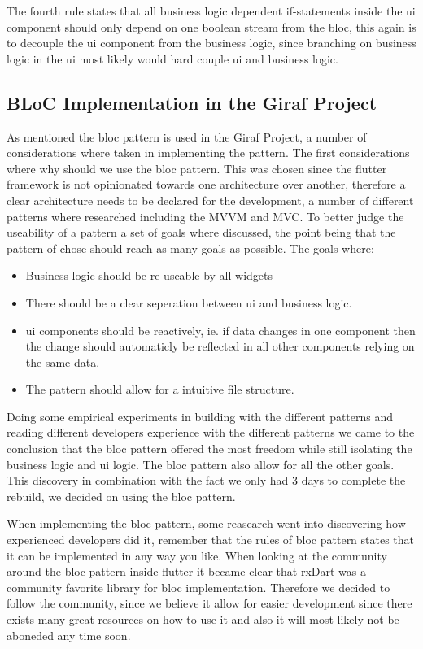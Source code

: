 The fourth rule states that all business logic dependent if-statements inside the \gls{ui} component should only depend on one boolean stream from the \gls{bloc}, this again is to decouple the \gls{ui} component from the business logic, since branching on business logic in the \gls{ui} most likely would hard couple \gls{ui} and business logic.

\subsection{BLoC Implementation in the Giraf Project}
As mentioned the \gls{bloc} pattern is used in the Giraf Project, a number of considerations where taken in implementing the pattern. The first considerations where why should we use the \gls{bloc} pattern. This was chosen since the flutter framework is not opinionated towards one architecture over another, therefore a clear architecture needs to be declared for the development, a number of different patterns where researched including the MVVM and MVC. To better judge the useability of a pattern a set of goals where discussed, the point being that the pattern of chose should reach as many goals as possible. The goals where:

\begin{itemize}
  \item Business logic should be re-useable by all widgets
  \item There should be a clear seperation between \gls{ui} and business logic.
  \item \gls{ui} components should be reactively, ie. if data changes in one component then the change should automaticly be reflected in all other components relying on the same data.
  \item The pattern should allow for a intuitive file structure.
\end{itemize}

Doing some empirical experiments in building with the different patterns and reading different developers experience with the different patterns we came to the conclusion that the \gls{bloc} pattern offered the most freedom while still isolating the business logic and \gls{ui} logic. The \gls{bloc} pattern also allow for all the other goals. This discovery in combination with the fact we only had 3 days to complete the rebuild, we decided on using the \gls{bloc} pattern.

When implementing the \gls{bloc} pattern, some reasearch went into discovering how experienced developers did it, remember that the rules of \gls{bloc} pattern states that it can be implemented in any way you like. When looking at the community around the \gls{bloc} pattern inside flutter it became clear that rxDart was a community favorite library for \gls{bloc} implementation. Therefore we decided to follow the community, since we believe it allow for easier development since there exists many great resources on how to use it and also it will most likely not be aboneded any time soon.

